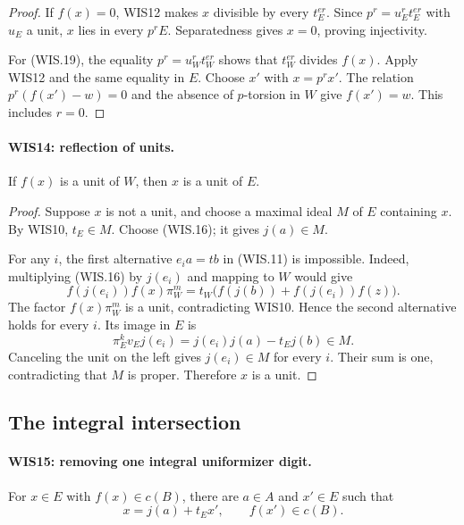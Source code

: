 \begin{proof}
If $f(x)=0$, WIS12 makes $x$ divisible by every
$t_E^{er}$. Since $p^r=u_E^rt_E^{er}$ with $u_E$
a unit, $x$ lies in every $p^rE$. Separatedness gives
$x=0$, proving injectivity.

For (WIS.19), the equality $p^r=u_W^rt_W^{er}$
shows that $t_W^{er}$ divides $f(x)$. Apply WIS12
and the same equality in $E$. Choose $x'$ with
$x=p^rx'$. The relation $p^r(f(x')-w)=0$ and
the absence of $p$-torsion in $W$ give $f(x')=w$.
This includes $r=0$.
\end{proof}

\paragraph{WIS14: reflection of units.}
\label{claim:WIS14}
If $f(x)$ is a unit of $W$, then $x$ is a unit of $E$.

\begin{proof}
Suppose $x$ is not a unit, and choose a maximal ideal
$M$ of $E$ containing $x$. By WIS10, $t_E\in M$.
Choose (WIS.16); it gives $j(a)\in M$.

For any $i$, the first alternative $e_i a=tb$ in
(WIS.11) is impossible. Indeed, multiplying (WIS.16)
by $j(e_i)$ and mapping to $W$ would give
\[
 f(j(e_i)) f(x)\pi_W^m
       =t_W\bigl(f(j(b))+f(j(e_i))f(z)\bigr).
 \tag{WIS.20}
\]
The factor $f(x)\pi_W^m$ is a unit, contradicting WIS10.
Hence the second alternative holds for every $i$.
Its image in $E$ is
\[
         \pi_E^kv_Ej(e_i)=j(e_i)j(a)-t_Ej(b)\in M.
\]
Canceling the unit on the left gives $j(e_i)\in M$
for every $i$. Their sum is one, contradicting that
$M$ is proper. Therefore $x$ is a unit.
\end{proof}

\subsection{The integral intersection}

\paragraph{WIS15: removing one integral uniformizer digit.}
\label{claim:WIS15}
For $x\in E$ with $f(x)\in c(B)$, there are $a\in A$
and $x'\in E$ such that
\[
                   x=j(a)+t_Ex',\qquad f(x')\in c(B).      \tag{WIS.21}
\]

